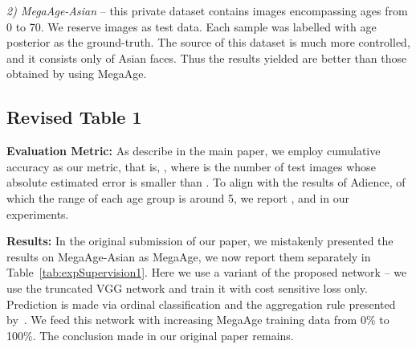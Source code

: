 \documentclass{bmvc2k}
\begin{document}
\noindent
\textsl{2) MegaAge-Asian} -- this private dataset contains  images encompassing ages from 0 to 70. We reserve  images as test data. Each sample was labelled with age posterior as the ground-truth. The source of this dataset is much more controlled, and it consists only of Asian faces. Thus the results yielded are better than those obtained by using MegaAge.

\subsection*{Revised Table 1}


\noindent
\textbf{Evaluation Metric:} 
As describe in the main paper, we employ cumulative accuracy as our metric, that is, , where  is the number of test images whose absolute estimated error is smaller than . To align with the results of Adience, of which the range of each age group is around 5, we report ,  and  in our experiments. 

\noindent
\textbf{Results:} 
In the original submission of our paper, we mistakenly presented the results on MegaAge-Asian as MegaAge, we now report them separately in Table~\ref{tab:expSupervision1}.
Here we use a variant of the proposed network -- we use the truncated VGG network and train it with cost sensitive loss only. Prediction is made via ordinal classification and the aggregation rule presented by~\cite{chang2011ordinal}. We feed this network with increasing MegaAge training data from 0\% to 100\%.
The conclusion made in our original paper remains.
\end{document}

